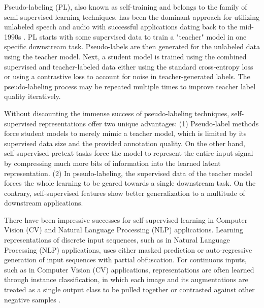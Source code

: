 Pseudo-labeling (PL), also known as self-training and belongs to the family of semi-supervised learning techniques, has been the dominant approach for utilizing unlabeled speech and audio with successful applications dating back to the mid-1990s \cite{Zavaliagkos_98, ma_bbn_06, kahn2020self, hsu2020semi}. PL starts with some supervised data to train a "teacher" model in one specific downstream task. Pseudo-labels are then generated for the unlabeled data using the teacher model. Next, a student model is trained using the combined supervised and teacher-labeled data either using the standard cross-entropy \cite{kahn2020self} loss or using a contrastive loss \cite{xiao2021contrastive} to account for noise in teacher-generated labels. The pseudo-labeling process may be repeated multiple times to improve teacher label quality \cite{xu2020iterative} iteratively.

Without discounting the immense success of pseudo-labeling techniques, self-supervised representations offer two unique advantages: (1) Pseudo-label methods force student models to merely mimic a teacher model, which is limited by its supervised data size and the provided annotation quality. On the other hand, self-supervised pretext tasks force the model to represent the entire input signal by compressing much more bits of information into the learned latent representation. (2) In pseudo-labeling, the supervised data of the teacher model forces the whole learning to be geared towards a single downstream task. On the contrary, self-supervised features show better generalization to a multitude of downstream applications.

There have been impressive successes for self-supervised learning in Computer Vision (CV) \cite{caron2020Swav, Chen2020SimSiam, grill2020byol} and Natural Language Processing (NLP) \cite{brown2020gpt3, liu2019roberta, lewis2019bart} applications. Learning representations of discrete input sequences, such as in Natural Language Processing (NLP) applications, uses either masked prediction \cite{devlin2018bert, clark2020electra} or auto-regressive generation \cite{peters2018deep, lewis2019bart} of input sequences with partial obfuscation. For continuous inputs, such as in Computer Vision (CV) applications, representations are often learned through instance classification, in which each image and its augmentations are treated as a single output class to be pulled together \cite{Chen2020SimSiam, grill2020byol} or contrasted against other negative samples \cite{he2020momentum}.

